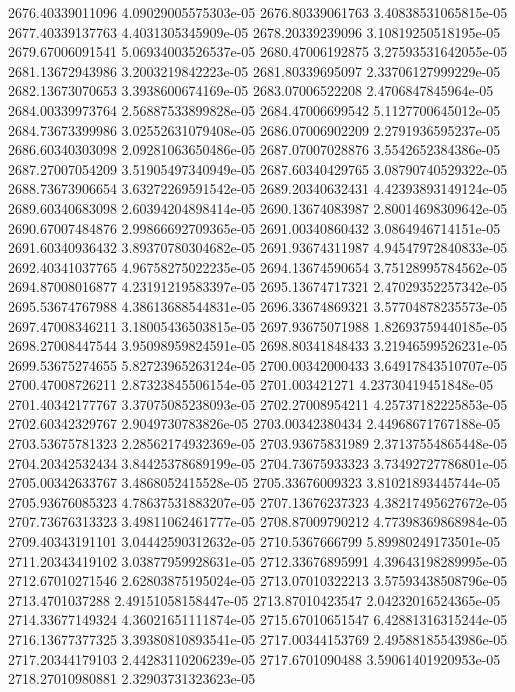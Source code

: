 {2676.40339011096 4.09029005575303e-05
2676.80339061763 3.40838531065815e-05
2677.40339137763 4.4031305345909e-05
2678.20339239096 3.10819250518195e-05
2679.67006091541 5.06934003526537e-05
2680.47006192875 3.27593531642055e-05
2681.13672943986 3.2003219842223e-05
2681.80339695097 2.33706127999229e-05
2682.13673070653 3.3938600674169e-05
2683.07006522208 2.4706847845964e-05
2684.00339973764 2.56887533899828e-05
2684.47006699542 5.1127700645012e-05
2684.73673399986 3.02552631079408e-05
2686.07006902209 2.2791936595237e-05
2686.60340303098 2.09281063650486e-05
2687.07007028876 3.5542652384386e-05
2687.27007054209 3.51905497340949e-05
2687.60340429765 3.08790740529322e-05
2688.73673906654 3.63272269591542e-05
2689.20340632431 4.42393893149124e-05
2689.60340683098 2.60394204898414e-05
2690.13674083987 2.80014698309642e-05
2690.67007484876 2.99866692709365e-05
2691.00340860432 3.0864946714151e-05
2691.60340936432 3.89370780304682e-05
2691.93674311987 4.94547972840833e-05
2692.40341037765 4.96758275022235e-05
2694.13674590654 3.75128995784562e-05
2694.87008016877 4.23191219583397e-05
2695.13674717321 2.47029352257342e-05
2695.53674767988 4.38613688544831e-05
2696.33674869321 3.57704878235573e-05
2697.47008346211 3.18005436503815e-05
2697.93675071988 1.82693759440185e-05
2698.27008447544 3.95098959824591e-05
2698.80341848433 3.21946599526231e-05
2699.53675274655 5.82723965263124e-05
2700.00342000433 3.64917843510707e-05
2700.47008726211 2.87323845506154e-05
2701.003421271 4.23730419451848e-05
2701.40342177767 3.37075085238093e-05
2702.27008954211 4.25737182225853e-05
2702.60342329767 2.9049730783826e-05
2703.00342380434 2.44968671767188e-05
2703.53675781323 2.28562174932369e-05
2703.93675831989 2.37137554865448e-05
2704.20342532434 3.84425378689199e-05
2704.73675933323 3.73492727786801e-05
2705.00342633767 3.4868052415528e-05
2705.33676009323 3.81021893445744e-05
2705.93676085323 4.78637531883207e-05
2707.13676237323 4.38217495627672e-05
2707.73676313323 3.49811062461777e-05
2708.87009790212 4.77398369868984e-05
2709.40343191101 3.04442590312632e-05
2710.5367666799 5.89980249173501e-05
2711.20343419102 3.03877959928631e-05
2712.33676895991 4.39643198289995e-05
2712.67010271546 2.62803875195024e-05
2713.07010322213 3.57593438508796e-05
2713.4701037288 2.49151058158447e-05
2713.87010423547 2.04232016524365e-05
2714.33677149324 4.36021651111874e-05
2715.67010651547 6.42881316315244e-05
2716.13677377325 3.39380810893541e-05
2717.00344153769 2.49588185543986e-05
2717.20344179103 2.44283110206239e-05
2717.6701090488 3.59061401920953e-05
2718.27010980881 2.32903731323623e-05
}
